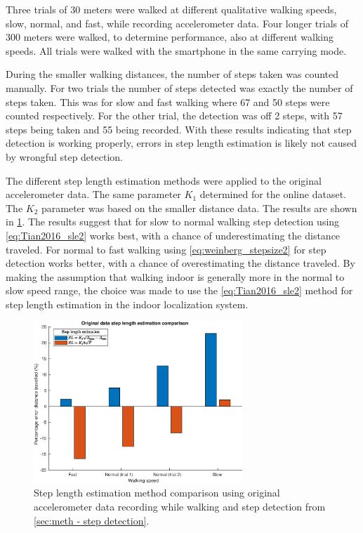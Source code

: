 Three trials of 30 meters were walked at different qualitative walking speeds, slow, normal, and fast, while recording accelerometer data. Four longer trials of 300 meters were walked, to determine performance, also at different walking speeds. All trials were walked with the smartphone in the same carrying mode. \par 

During the smaller walking distances, the number of steps taken was counted manually. For two trials the number of steps detected was exactly the number of steps taken. This was for slow and fast walking where 67 and 50 steps were counted respectively.  For the other trial, the detection was off 2 steps, with 57 steps being taken and 55 being recorded. With these results indicating that step detection is working properly, errors in step length estimation is likely not caused by wrongful step detection.  \par 

The different step length estimation methods were applied to the original accelerometer data. The same parameter $ K_1 $ determined for the online dataset. The $ K_2 $ parameter was based on the smaller distance data. The results are shown in \cref{fig:step_length_personal_testing}. The results suggest that for slow to normal walking step detection using \eqref{eq:Tian2016_sle2} works best, with a chance of underestimating the distance traveled. For normal to fast walking using \eqref{eq:weinberg_stepsize2} for step detection works better, with a chance of overestimating the distance traveled. By making the assumption that walking indoor is generally more in the normal to slow speed range, the choice was made to use the \eqref{eq:Tian2016_sle2} method for step length estimation in the indoor localization system.
\begin{figure}[H]
	\centering
	\includegraphics[width=0.7\textwidth]{images/20201128_1430_Original_data_step_length_estimation_comparison}
		\setlength{\belowcaptionskip}{-15pt}
	\caption{Step length estimation method comparison using original accelerometer data recording while walking and step detection from \cref{sec:meth - step detection}. }
	\label{fig:step_length_personal_testing}
\end{figure}

